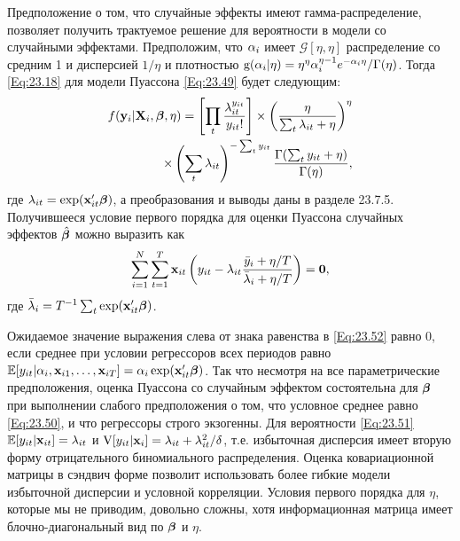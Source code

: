 Предположение о том, что случайные эффекты имеют гамма-распределение, позволяет получить трактуемое решение для вероятности в модели со случайными эффектами. Предположим, что $\alpha_i$ имеет $\mathcal{G}[\eta, \eta]$ распределение со средним 1 и дисперсией $1/\eta$ и плотностью $\mathrm g(\alpha_i|\eta)=\eta^{\eta} \alpha_i^{\eta-1} e^{-\alpha_i\eta} / \Gamma(\eta)$. Тогда \ref{Eq:23.18} для модели Пуассона \ref{Eq:23.49} будет следующим:
\begin{align}
f(\mathbf{y}_i |\mathbf{X}_i, \bm{\beta}, \eta) = 
\left[ \prod_t \frac{\lambda^{y_{it}}_{it}}{y_{it}!} \right]
\times \left( \frac{\eta}{\sum_t \lambda_{it}+\eta} \right)^{\eta} 
\label{Eq:23.51} \\
\times \left( \sum_t \lambda_{it} \right)^{-\sum_t y_{it}}
\frac{\Gamma (\sum_t y_{it} + \eta)}{\Gamma(\eta)}, \nonumber
\end{align}
где $\lambda_{it}=\exp (\mathbf{x}'_{it}\bm{\beta})$, а преобразования и выводы даны в разделе 23.7.5. Получившееся условие первого порядка для оценки Пуассона случайных эффектов $\hat{\bm{\beta}}$ можно выразить как
\begin{align}
\sum^N_{i=1} \sum^T_{t=1} \mathbf{x}_{it} \left(y_{it} - \lambda_{it} \frac{\bar{y}_i + \eta/T}{\bar{\lambda}_i + \eta/T} \right) = \mathbf{0},
\label{Eq:23.52}
\end{align}
где $\bar{\lambda}_i = T^{-1} \sum_t \exp (\mathbf{x}'_{it}\bm{\beta})$.

Ожидаемое значение выражения слева от знака равенства в \ref{Eq:23.52} равно 0, если среднее при условии регрессоров всех периодов равно $\mathbb{E} [y_{it}|\alpha_i, \mathbf{x}_{i1}, \dots, \mathbf{x}_{iT}]=\alpha_i \exp  (\mathbf{x}'_{it} \bm{\beta})$. Так что несмотря на все параметрические предположения, оценка Пуассона со случайным эффектом состоятельна для $\bm{\beta}$ при выполнении слабого предположения о том, что условное среднее равно \ref{Eq:23.50}, и что регрессоры строго экзогенны. Для вероятности \ref{Eq:23.51} $\mathbb{E} [y_{it}|\mathbf{x}_{it}]=\lambda_{it}$ и $\mathrm{V}[y_{it}|\mathbf{x}_i]=\lambda_{it}+\lambda^2_{it}/\delta$, т.е. избыточная дисперсия имеет вторую форму отрицательного биномиального распределения. Оценка  ковариационной матрицы в сэндвич форме позволит использовать более гибкие модели избыточной дисперсии и условной корреляции. Условия первого порядка для $\eta$, которые мы не приводим, довольно сложны, хотя информационная матрица имеет блочно-диагональный вид по $\bm{\beta}$ и $\eta$.

